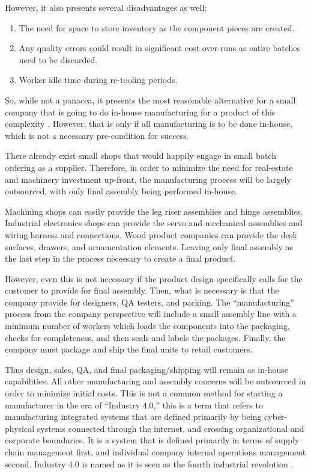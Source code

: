 \documentclass[man]{apa7}
\begin{document}
However, it also presents several disadvantages as well:

\begin{enumerate}
\item The need for space to store inventory as the component pieces are created.
\item Any quality errors could result in significant cost over-runs as entire batches need to be discarded.
\item Worker idle time during re-tooling periods.
\end{enumerate}

So, while not a panacea, it presents the most reasonable alternative for a small company that is going to do in-house manufacturing for a product of this complexity \parencite{schroederOperationsManagementContemporary2010} . However, that is only if all manufacturing is to be done in-house, which is not a necessary pre-condition for success.

There already exist small shops that would happily engage in small batch ordering as a supplier. Therefore, in order to minimize the need for real-estate and machinery investment up-front, the manufacturing process will be largely outsourced, with only final assembly being performed in-house.

Machining shops can easily provide the leg riser assemblies and hinge assemblies. Industrial electronics shops can provide the servo and mechanical assemblies and wiring harness and connections. Wood product companies can provide the desk surfaces, drawers, and ornamentation elements. Leaving only final assembly as the last step in the process necessary to create a final product.

However, even this is not necessary if the product design specifically calls for the customer to provide for final assembly. Then, what is necessary is that the company provide for designers, QA testers, and packing. The ``manufacturing'' process from the company perspective will include a small assembly line with a minimum number of workers which loads the components into the packaging, checks for completeness, and then seals and labels the packages. Finally, the company must package and ship the final units to retail customers.

Thus design, sales, QA, and final packaging/shipping will remain as in-house capabilities. All other manufacturing and assembly concerns will be outsourced in order to minimize initial costs. This is not a common method for starting a manufacturer in the era of ``Industry 4.0,'' this is a term that refers to manufacturing integrated systems that are defined primarily by being cyber-physical systems connected through the internet, and crossing organizational and corporate boundaries. It is a system that is defined primarily in terms of supply chain management first, and individual company internal operations management second. Industry 4.0 is named as it is seen as the fourth industrial revolution \parencite{sorooshianImpacts4thIndustrial2020}.
\end{document}

